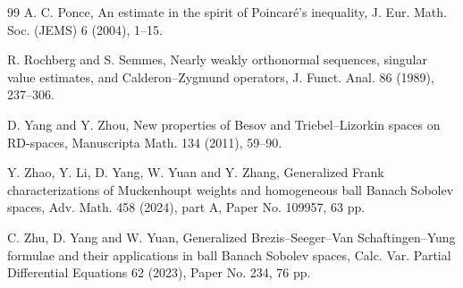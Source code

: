 \documentclass[11pt]{amsart}
\theoremstyle{definition}
\theoremstyle{remark}
\numberwithin{equation}{section}
\begin{document}
\begin{thebibliography}{99}
A. C. Ponce,
An estimate in the spirit of Poincar\'e's inequality,
J. Eur. Math. Soc. (JEMS) 6 (2004), 1--15.


R. Rochberg and S. Semmes,
Nearly weakly orthonormal sequences, singular value estimates, and Calderon--Zygmund
operators,
J. Funct. Anal. 86 (1989), 237--306.


D. Yang and Y. Zhou,
New properties of Besov and Triebel--Lizorkin spaces on RD-spaces,
Manuscripta Math. 134 (2011), 59--90.


Y. Zhao, Y. Li, D. Yang, W. Yuan and Y. Zhang,
Generalized Frank characterizations of Muckenhoupt weights and homogeneous ball Banach
Sobolev spaces,
Adv. Math. 458 (2024), part A, Paper No. 109957, 63 pp.


C. Zhu, D. Yang and W. Yuan,
Generalized Brezis--Seeger--Van Schaftingen--Yung formulae and their applications
in ball Banach Sobolev spaces,
Calc. Var. Partial Differential Equations 62 (2023), Paper No. 234, 76 pp.

\end{thebibliography}
\end{document}
